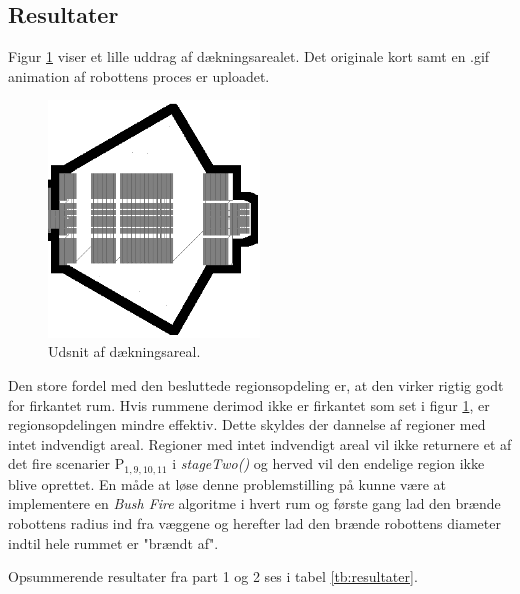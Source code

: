 \newpage
\subsection{Resultater}
Figur \ref{fig:res} viser et lille uddrag af dækningsarealet. Det originale kort samt en .gif animation af robottens proces er uploadet.
\begin{figure}[th!]
\centering
\includegraphics[width=0.5\textwidth]{./graphics/efterVask}
\caption[tekst i indholdsfortegnelsen]{Udsnit af dækningsareal.}
\label{fig:res}
\end{figure}
Den store fordel med den besluttede regionsopdeling er, at den virker rigtig godt for firkantet rum. Hvis rummene derimod ikke er firkantet som set i figur \ref{fig:res}, er regionsopdelingen mindre effektiv. Dette skyldes der dannelse af regioner med intet indvendigt areal. Regioner med intet indvendigt areal vil ikke returnere et af det fire scenarier P\(_{1, 9, 10, 11}\) i \emph{stageTwo()} og herved vil den endelige region ikke blive oprettet.
En måde at løse denne problemstilling på kunne være at implementere en \emph{Bush Fire} algoritme i hvert rum og første gang lad den brænde robottens radius ind fra væggene og herefter lad den brænde robottens diameter indtil hele rummet er "brændt af".


Opsummerende resultater fra part 1 og 2 ses i tabel \ref{tb:resultater}. 

